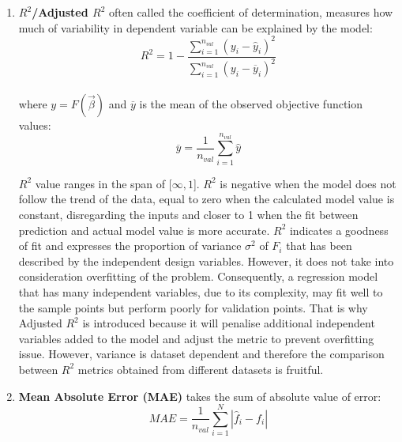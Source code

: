 \begin{enumerate}
\item \textbf{$R^2$/Adjusted $R^2$} often called the 
coefficient of determination, measures how much of 
variability in dependent variable can be explained by the 
model\cite{error_scores}:
\begin{equation}
R^2 = 1 - \dfrac{\sum_{i=1}^{n_{val}} 
\left( y_{i} - \widehat{y}_{i} \right)^2}{\sum_{i=1}
^{n_{val}} \left( y_{i} - \overline{y}_{i} \right)^2}
\end{equation}
\\[-2mm]
where $y = F(\vec{β})$ and $\overline{y}$ is 
the mean of the observed objective function values:
\begin{equation}
\overline{y} = \dfrac{1}{n_{val}} \sum_{i=1}^{n_{val}}
\widehat{y}
\end{equation}

\newpage


$R^2$ value ranges in the span of [$\infty,1$]. $R^2$
is negative when the model does not follow the trend of 
the data, equal to zero when the calculated model value 
is constant, disregarding the inputs and closer to 1 
when the fit between prediction and actual model value
is more accurate. $R^2$ indicates a goodness of fit and 
expresses the proportion of variance $σ^2$ of $F_{i}$   
that has been described by the independent design 
variables. However, it does not take into 
consideration overfitting of the problem. Consequently, 
a regression model that has many independent variables, 
due to its complexity, may fit well to the sample 
points but perform poorly for validation points. That 
is why Adjusted $R^2$ is introduced because it will 
penalise additional independent variables added to the 
model and adjust the metric to prevent overfitting issue.
However, variance is dataset dependent and therefore the
comparison between $R^2$ metrics obtained from different 
datasets is fruitful.   

\item \textbf{ Mean Absolute Error (MAE)} takes the sum
of absolute value of error\cite{error_scores}:
\begin{equation}
MAE = \dfrac{1}{n_{val}} \sum_{i=1}^N \left|  \hat{f}_{i} - f_{i}
\right|
\end{equation}

\end{enumerate}

